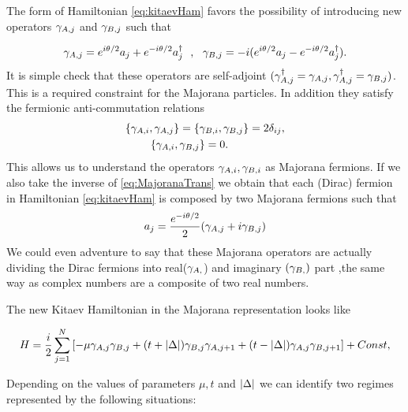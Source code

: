 The form of Hamiltonian \eqref{eq:kitaevHam} favors the possibility of introducing new operators $\gamma_{A,j}$ and $\gamma_{B,j}$ such that

\begin{equation}
\gamma_{A,j} = e^{i\theta /2}a_j+ e^{-i\theta/2 } a^{\dagger}_j \ \ , \ \ \gamma_{B,j} = -i(e^{i\theta /2}a_j - e^{-i\theta/2} a^{\dagger}_j).
\label{eq:MajoranaTrans}
\end{equation}
It is simple check that these operators are self-adjoint $(\gamma_{A,j}^\dagger = \gamma_{A,j}, \gamma_{A,j}^\dagger = \gamma_{B,j})$. This is a required constraint for the Majorana particles. In addition they satisfy the fermionic anti-commutation relations
\begin{equation}
\begin{aligned}
\{\gamma_{A,i}, \gamma_{A,j}\} = \{ & \gamma_{B,i} , \gamma_{B,j}\} = 2\delta_{ij}  ,\\ 
  \{\gamma_{A,i}, \gamma_{B,j} & \} =0.
\end{aligned} 
\label{MajoranaRel}
\end{equation} 
This allows us to understand the operators $\gamma_{A,i} , \gamma_{B,i}$ as Majorana fermions. If we also take the inverse of \ref{eq:MajoranaTrans} we obtain that each  (Dirac) fermion in Hamiltonian \eqref{eq:kitaevHam} is composed by two Majorana fermions such that 
$$a_j = \frac{e^{-i\theta/2}}{2}(\gamma_{A,j}+ i\gamma_{B,j})$$
We could even adventure to say that these Majorana operators are actually dividing the Dirac fermions into real($\gamma_{A,}$) and imaginary $(\gamma_{B,})$ part ,the same way as complex numbers are a composite of two real numbers. 

The new Kitaev Hamiltonian in the Majorana representation looks like 

\begin{equation}
H = \frac{i}{2} \sum_{j=1}^N \left[ -\mu \gamma_{A,j}\gamma_{B,j}  + (t+ \vert \Delta \vert) \gamma_{B,j}\gamma_{A,j+1} + (t- \vert \Delta \vert) \gamma_{A,j}\gamma_{B,j+1} \right]+Const,\label{eq:HamMajorana}
\end{equation}

Depending on the values of parameters $\mu, t$ and $\vert \Delta \vert$ we can identify two regimes represented by the following situations:





